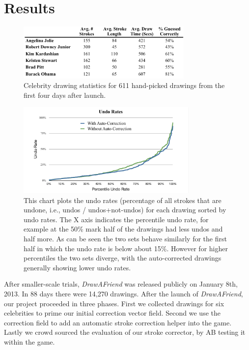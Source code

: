 \section{Results}
\begin{figure}
  \centering%
\includegraphics[height=1.1in]{./figures/daf-stats-cropped.pdf}
  \caption{Celebrity drawing statistics for 611 hand-picked drawings from the first four days after launch.}
  \label{fig:daf-stats}
\end{figure}


\begin{figure}
  \centering%
\includegraphics[width=3.5in]{./figures/userstudy/undoRates_chart_cropped.pdf}
  \caption{This chart plots the undo rates (percentage of all strokes that are undone, i.e., undos / undos+not-undos) for
each drawing sorted by undo rates. The X axis indicates the percentile undo rate, for example at the 50\% mark half of the
drawings had less undos and half more. As can be seen the two sets behave similarly for the first half in which the undo
rate is below about 15\%. However for higher percentiles the two sets diverge, with the auto-corrected drawings generally
showing lower undo rates.}
  \label{fig:daf-undos}
\end{figure}



After smaller-scale trials, \emph{DrawAFriend} was released publicly on January 8th, 2013. In 88 days there were 14,270 drawings. After the launch of \emph{DrawAFriend}, our project proceeded in three phases. First we collected drawings for six celebrities to prime our initial correction vector field. Second we use the correction field to add an automatic stroke correction helper into the game. Lastly we crowd sourced the evaluation of our stroke corrector, by AB testing it within the game.

